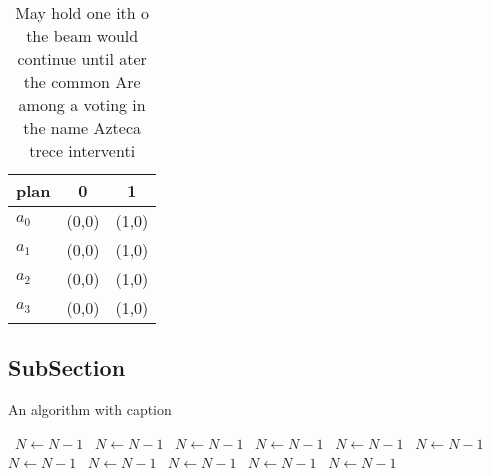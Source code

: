 \documentclass[a4paper]{article}
\begin{document}
\begin{table}
\begin{adjustbox}{width=0.9\columnwidth}
\begin{tabular}{|l|l|l|}
\hline
\textbf{plan} & \multicolumn{1}{c|}{\textbf{0}} & \multicolumn{1}{c|}{\textbf{1}} \\ \hline
\textbf{$a_0$}  & (0,0) & (1,0) \\ \hline
\textbf{$a_1$}  & (0,0) & (1,0) \\ \hline
\textbf{$a_2$}  & (0,0) & (1,0) \\ \hline
\textbf{$a_3$}  & (0,0) & (1,0) \\ \hline
\end{tabular}
\end{adjustbox}
\caption{May hold one ith o the beam would continue until ater the common Are among a voting in the name Azteca trece interventi
}
\end{table}

\subsection{SubSection}

\begin{algorithm}
\caption{An algorithm with caption}
\begin{algorithmic}
\    \State $N \gets N - 1$
\    \State $N \gets N - 1$
\    \State $N \gets N - 1$
\    \State $N \gets N - 1$
\    \State $N \gets N - 1$
\    \State $N \gets N - 1$
\    \State $N \gets N - 1$
\    \State $N \gets N - 1$
\    \State $N \gets N - 1$
\    \State $N \gets N - 1$
\    \State $N \gets N - 1$
\EndWhile
\end{algorithmic}
\end{algorithm}
\end{document}
